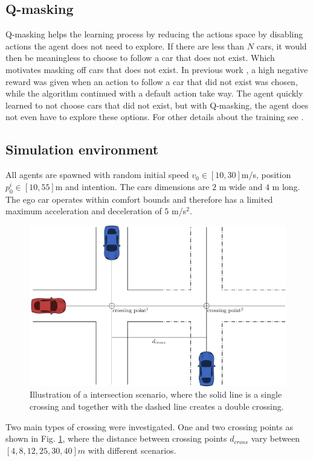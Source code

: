 \subsection{Q-masking}
\label{sec:masking}
Q-masking \cite{Mukadam2017} helps the learning process by reducing the actions space by disabling actions the agent does not need to explore. If there are less than $N$ cars, it would then be meaningless to choose to follow a car that does not exist. Which motivates masking off cars that does not exist. In previous work \cite{Tram2018}, a high negative reward was given when an action to follow a car that did not exist was chosen, while the algorithm continued with a default action take way. The agent quickly learned to not choose cars that did not exist, but with Q-masking, the agent does not even have to explore these options. For other details about the training see \cite{Tram2018}.

\subsection{Simulation environment}
All agents are spawned with random initial speed $v_0 \in [10,30]$m/s, position $p^i_0 \in [10,55]$m and intention. The cars dimensions are $2$ m wide and $4$ m long. The ego car operates within comfort bounds and therefore has a limited maximum acceleration and deceleration of $5$ m/s$^2$. 
\begin{figure}[t]
	\centering
	\includegraphics[width=.95\columnwidth]{figures/figures-scenarios.pdf}
	\caption{Illustration of a intersection scenario, where the solid line is a single crossing and together with the dashed line creates a double crossing.}
	\label{fig:scenario}
\end{figure}
Two main types of crossing were investigated. One and two crossing points as shown in Fig. \ref{fig:scenario}, where the distance between crossing points $d_{cross}$ vary between $[4, 8, 12, 25, 30, 40] m$ with different scenarios. 

